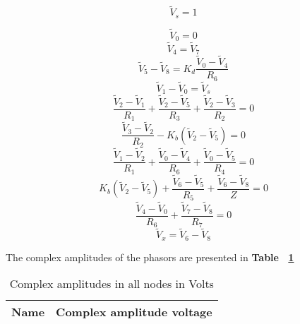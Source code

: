\begin {equation}
	\tilde{V}_s = 1
	\label{eq:vs}
\end{equation}

\begin {equation}
	\tilde{V}_0 = 0
	\label{eq:p1}
\end{equation}
\begin {equation}
	\tilde{V}_4 = \tilde{V}_7
	\label{eq:p2}
\end{equation}
\begin {equation}
	\tilde{V}_5 - \tilde{V}_8 = K_d \frac{\tilde{V}_0 - \tilde{V}_4}{R_6}
	\label{eq:p3}
\end{equation}
\begin {equation}
	\tilde{V}_1 - \tilde{V}_0 = \tilde{V}_s
	\label{eq:p4}
\end{equation}
\begin {equation}
	\frac{\tilde{V}_2-\tilde{V}_1}{R_1} + \frac{\tilde{V}_2 - \tilde{V}_5}{R_3} + \frac{\tilde{V}_2 - \tilde{V}_3}{R_2} = 0
	\label{eq:p5}
\end{equation}
\begin {equation}
	\frac{\tilde{V}_3-\tilde{V}_2}{R_2} - K_b(\tilde{V}_2-\tilde{V}_5)  = 0
	\label{eq:p6}
\end{equation}
\begin {equation}
	\frac{\tilde{V}_1-\tilde{V}_2}{R_1} + \frac{\tilde{V}_0-\tilde{V}_4}{R_6} + \frac{\tilde{V}_0-\tilde{V}_5}{R_4} = 0
	\label{eq:p7}
\end{equation}
\begin {equation}
	K_b(\tilde{V}_2-\tilde{V}_5) + \frac{\tilde{V}_6-\tilde{V}_5}{R_5} + \frac{\tilde{V}_6-\tilde{V}_8}{Z}  = 0
	\label{eq:p8}
\end{equation}
\begin {equation}
	\frac{\tilde{V}_4-\tilde{V}_0}{R_6} + \frac{\tilde{V}_7 - \tilde{V}_8}{R_7} = 0
	\label{eq:p9}
\end{equation}
\begin {equation}
	\tilde{V}_x = \tilde{V}_6 - \tilde{V}_8
	\label{eq:p10}
\end{equation}


The complex amplitudes of the phasors are presented in  \textbf{Table ~\ref{tab:equivalent resistor}}
\begin{table}[H]
  \centering
  \begin{tabular}{|l|r|}
    \hline    
    {\bf Name} & {\bf Complex amplitude voltage}\\ \hline
    
  \end{tabular}
  \caption{Complex amplitudes in all nodes in Volts}
  \label{tab:equivalent resistor}
\end{table}
\vspace{10cm}

